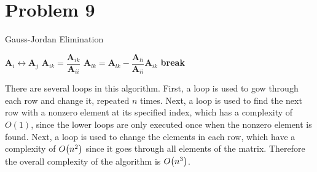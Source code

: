 \documentclass[10pt]{article}
\begin{document}
\section*{Problem 9}
\begin{algorithm}[H]
    \caption{Gauss-Jordan Elimination}        
    \begin{algorithmic}
                    \State $\mathbf{A}_i \leftrightarrow \mathbf{A}_j$
                    \State $\mathbf{A}_{ik} = \dfrac{\mathbf{A}_{ik}}{\mathbf{A}_{ii}}$ 
                    \State $\mathbf{A}_{lk} = \mathbf{A}_{lk} - \dfrac{\mathbf{A}_{li}}{\mathbf{A}_{ii}} \mathbf{A}_{ik}$ 
                    \State \textbf{break}
                \EndIf
            \EndWhile
        \EndWhile
        \EndFunction
    \end{algorithmic}
\end{algorithm}
There are several loops in this algorithm. First, a loop is used to gow through each row and change it, repeated $n$ times. 
Next, a loop is used to find the next row with a nonzero element at its specified index, which has a complexity of $O(1)$, since the lower loops are only executed once when the nonzero element is found.
Next, a loop is used to change the elements in each row, which have a complexity of $O\qty(n^2)$ since it goes through all elements of the matrix.
Therefore the overall complexity of the algorithm is $O\qty(n^3)$.
\end{document}
